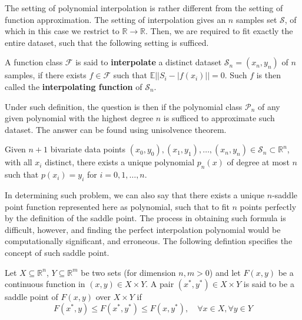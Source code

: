 \documentclass[
  journal=largetwo,
  year=2025,
  volume=37,
]{cup-journal}
\begin{document}
The setting of polynomial interpolation is rather different from the setting of function approximation. The setting of interpolation gives an $n$ samples set $\mathcal{S}$, of which in this case we restrict to $\mathbb{R}\to\mathbb{R}$. Then, we are required to fit exactly the entire dataset, such that the following setting is sufficed. 
\begin{definition}[Interpolation]
    A function class $\mathcal{F}$ is said to \textbf{interpolate} a distinct dataset $\mathcal{S}_{n}=(x_{n},y_{n})$ of $n$ samples, if there exists $f\in \mathcal{F}$ such that $\mathbb{E}||S_{i}-|f(x_{i})||= 0$. Such $f$ is then called the \textbf{interpolating function} of $\mathcal{S}_{n}$. 
\end{definition}
Under such definition, the question is then if the polynomial class $\mathcal{P}_{n}$ of any given polynomial with the highest degree $n$ is sufficed to approximate such dataset. The answer can be found using unisolvence theorem.

\begin{theorem}
    Given $n+1$ bivariate data points $(x_{0},y_{0}),(x_{1},y_{1}),\dots,(x_{n},y_{n})\in \mathcal{S}_{n}\subset \mathbb{R}^{n}$, with all $x_{i}$ distinct, there exists a unique polynomial $p_{n}(x)$ of degree at most $n$ such that $p(x_{i})=y_{i}$ for $i=0,1,\dots,n$.
\end{theorem}

In determining such problem, we can also say that there exists a unique $n$-saddle point function represented here as polynomial, such that to fit $n$ points perfectly by the definition of the saddle point. The process in obtaining such formula is difficult, however, and finding the perfect interpolation polynomial would be computationally significant, and erroneous. The following defintion specifies the concept of such saddle point. 

\begin{definition}
    Let $X\subseteq \mathbb{R}^{n}$, $Y\subseteq \mathbb{R}^{m}$ be two sets (for dimension $n,m>0$) and let $F(x,y)$ be a continuous function in $(x,y)\in X\times Y$. A pair $(x^{*},y^{*})\in X\times Y$ is said to be a saddle point of $F(x,y)$ over $X\times Y$ if \begin{equation}
        F(x^{*},y) \leq F(x^{*},y^{*})\leq F(x,y^{*}), \quad \forall x\in X, \forall y\in Y
    \end{equation}
\end{definition}
\end{document}
